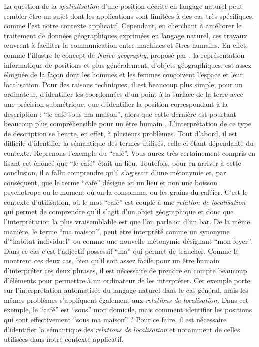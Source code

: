 La question de la \emph{spatialisation} d'une position décrite en
langage naturel peut sembler être un sujet dont les applications sont
limitées à des cas très spécifiques, comme l'est notre contexte
applicatif. Cependant, en cherchant à améliorer le traitement de
données géographiques exprimées en langage naturel, ces travaux
œuvrent à faciliter la communication entre machines et êtres
humains. En effet, comme l'illustre le concept de \emph{Naive
  geography}, proposé par \textcite{Egenhofer1995}, la représentation
informatique de positions et plus généralement, d'objets
géographiques, est assez éloignée de la façon dont les hommes et les
femmes conçoivent l'espace et leur localisation. Pour des raisons
techniques, il est beaucoup plus simple, pour un ordinateur,
d'identifier les coordonnées d'un point à la surface de la terre avec
une précision submétrique, que d'identifier la position correspondant
à la description : \enquote{le café sous ma maison}, alors que cette
dernière est pourtant beaucoup plus compréhensible pour un être humain
\autocite{Duchene2019}. L'interprétation de ce type de description se
heurte, en effet, à plusieurs problèmes. Tout d'abord, il est
difficile d'identifier la sémantique des termes utilisés, celle-ci
étant dépendante du contexte. Reprenons l'exemple du
\enquote{café}. Vous aurez très certainement compris en lisant cet
énoncé que \enquote{le café} était un lieu. Toutefois, pour en arriver
à cette conclusion, il a fallu comprendre qu'il s'agissait d'une
métonymie et, par conséquent, que le terme \enquote{café} désigne ici
un lieu et non une boisson psychotrope ou le moment où on la consomme,
ou les grains du caféier. C'est le contexte d’utilisation, où le mot
\enquote{café} est couplé à une \emph{relation de localisation} qui
permet de comprendre qu'il s'agit d'un objet géographique et donc que
l'interprétation la plus vraisemblable est que l'on parle ici d'un
bar. De la même manière, le terme \enquote{ma maison}, peut être
interprété comme un synonyme d'\enquote{habitat individuel} ou comme
une nouvelle métonymie désignant \enquote{mon foyer}. Dans ce cas
c'est l'adjectif possessif \enquote{ma} qui permet de trancher. Comme
le montrent ces deux cas, bien qu'il soit assez facile pour un être
humain d'interpréter ces deux phrases, il est nécessaire de prendre en
compte beaucoup d'éléments pour permettre à un ordinateur de les
interpréter. Cet exemple porte sur l'interprétation automatisée du
langage naturel dans le cas général, mais les mêmes problèmes
s'appliquent également aux \emph{relations de localisation.} Dans cet
exemple, le \enquote{café} est \enquote{sous} mon domicile, mais
comment identifier les positions qui sont effectivement \enquote{sous
  ma maison} ? Pour ce faire, il est nécessaire d'identifier la
sémantique des \emph{relations de localisation} et notamment de celles
utilisées dans notre contexte applicatif.

